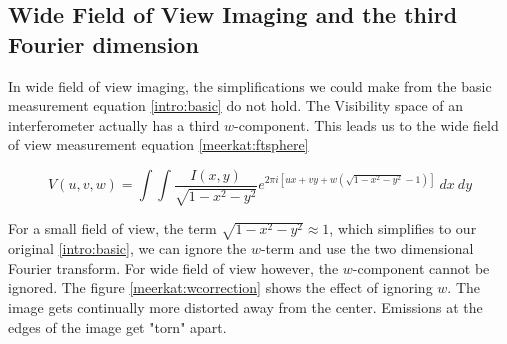 \subsection{Wide Field of View Imaging and the third Fourier dimension} \label{meerkat:wof}
In wide field of view imaging, the simplifications we could make from the basic measurement equation \eqref{intro:basic} do not hold. The Visibility space of an interferometer actually has a third $w$-component. This leads us to the wide field of view measurement equation \eqref{meerkat:ftsphere}

\begin{equation}\label{meerkat:ftsphere}
V(u, v, w) = \int\int \frac{I(x, y)}{\sqrt{1 - x^2 - y ^2}} e^{2 \pi i [ux+vy+ w(\sqrt{1 - x^2 - y ^2} - 1)]} \: dx \: dy
\end{equation}

For a small field of view, the term  $\sqrt{1 - x^2 - y ^2} \approx 1$, which simplifies to our original \eqref{intro:basic}, we can ignore the $w$-term and use the two dimensional Fourier transform. For wide field of view however, the $w$-component cannot be ignored. The figure \ref{meerkat:wcorrection} shows the effect of ignoring $w$. The image gets continually more distorted away from the center. Emissions at the edges of the image get "torn" apart.


